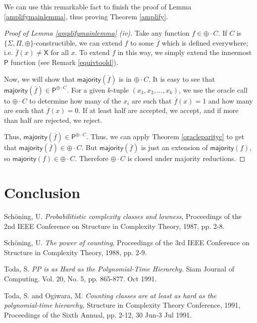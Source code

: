 \documentclass[11pt]{article}
\newcommand{\parity}{\oplus}
\newcommand{\p}{\textsf{P}}
\newcommand{\x}{\textsf{X}}
\newcommand{\majority}{\textsf{majority}}
\begin{document}
We can use this remarkable fact to finish the proof of Lemma \ref{amplifymainlemma}, thus proving Theorem \ref{amplify}.
\begin{proof}[Proof of Lemma \ref{amplifymainlemma} (iv)]
Take any function $f \in \parity \cdot C$. If $C$ is $\{\Sigma, \Pi, \parity\}$-constructible, we can extend $f$ to some $\overline{f}$ which is defined everywhere; i.e. $\overline{f}(x) \ne \x$ for all $x$. To extend $f$ in this way, we simply extend the innermost $\p$ function (see Remark \ref{equivtoold}).

Now, we will show that $\majority(\overline{f})$ is in $\parity \cdot C$. It is easy to see that $\majority(\overline{f}) \in \p^{\parity \cdot C}$. For a given $k$-tuple $(x_1,x_2,...,x_k)$, we use the oracle call to $\parity \cdot C$ to determine how many of the $x_i$ are such that $\overline{f}(x) = 1$ and how many are such that $\overline{f}(x) = 0$. If at least half are accepted, we accept, and if more than half are rejected, we reject.

Thus, $\majority(\overline{f}) \in \p^{\parity \cdot C}$. Thus, we can apply Theorem \ref{oracleparityc} to get that $\majority(\overline{f}) \in \parity \cdot C$. But $\majority(\overline{f})$ is just an extension of $\majority(f)$, so $\majority(f) \in \parity \cdot C$. Therefore $\parity \cdot C$ is closed under majority reductions.
\end{proof}

\section{Conclusion}

\pagebreak

\begin{thebibliography}{9}


 Sch\"oning, U. \emph{Probabilitistic complexity classes and lowness}, Proceedings of the 2nd IEEE Conference on Structure in Complexity Theory, 1987, pp. 2-8.

 Sch\"oning, U. \emph{The power of counting}, Proceedings of the 3rd IEEE Conference on Structure in Complexity Theory, 1988, pp. 2-9.

Toda, S. \emph{PP is as Hard as the Polynomial-Time Hierarchy.} Siam Journal of Computing. Vol. 20, No. 5, pp. 865-877. Oct 1991.

 Toda, S. and Ogiwara, M. \emph{Counting classes are at least as hard as the polynomial-time hierarchy,} Structure in Complexity Theory Conference, 1991, Proceedings of the Sixth Annual, pp. 2-12, 30 Jun-3 Jul 1991.

\end{thebibliography}
\end{document}
